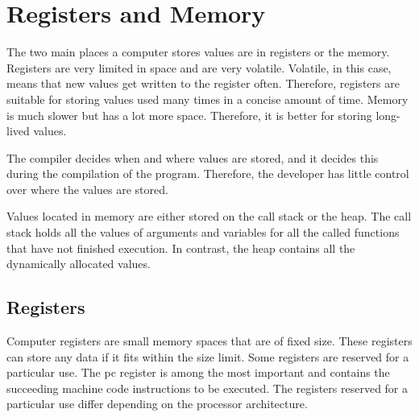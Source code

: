  

\section{Registers and Memory}
\label{sec:regmem}
The two main places a computer stores values are in registers or the memory.
Registers are very limited in space and are very volatile.
Volatile, in this case, means that new values get written to the register often.
Therefore, registers are suitable for storing values used many times in a concise amount of time.
Memory is much slower but has a lot more space.
Therefore, it is better for storing long-lived values.


The compiler decides when and where values are stored, and it decides this during the compilation of the program.
Therefore, the developer has little control over where the values are stored.


Values located in memory are either stored on the call stack or the heap.
The call stack holds all the values of arguments and variables for all the called functions that have not finished execution.
In contrast, the heap contains all the dynamically allocated values.


\subsection{Registers}
Computer registers are small memory spaces that are of fixed size.
These registers can store any data if it fits within the size limit.
Some registers are reserved for a particular use.
The \acrfull{pc} register is among the most important and contains the succeeding machine code instructions to be executed.
The registers reserved for a particular use differ depending on the processor architecture.


